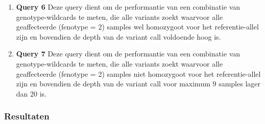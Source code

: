 \begin{enumerate}
\item \textbf{Query 6} Deze query dient om de performantie van een combinatie van genotype-wildcards te meten, die alle variants zoekt waarvoor alle geaffecteerde (fenotype = 2) samples wel homozygoot voor het referentie-allel zijn en bovendien de depth van de variant call voldoende hoog is.

\begin{adjustwidth}{-1.0in}{}

\end{adjustwidth}

\item \textbf{Query 7} Deze query dient om de performantie van een combinatie van genotype-wildcards te meten, die alle variants zoekt waarvoor alle geaffecteerde (fenotype = 2) samples niet homozygoot voor het referentie-allel zijn en bovendien de depth van de variant call voor maximum 9 samples lager dan 20 is.

\begin{adjustwidth}{-1.0in}{}

\end{adjustwidth}

\end{enumerate}

\subsubsection{Resultaten}

